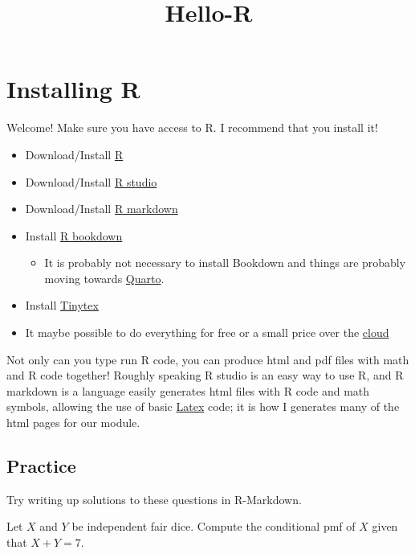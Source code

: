 \documentclass[
]{article}
\title{Hello-R}
\author{}
\date{\vspace{-2.5em}}
\providecommand{\tightlist}{%
  \setlength{\itemsep}{0pt}\setlength{\parskip}{0pt}}
\begin{document}
\maketitle

\section{Installing R}\label{installing-r}

Welcome! Make sure you have access to R. I recommend that you install
it!

\begin{itemize}
\item
  Download/Install \href{https://www.r-project.org/}{R}
\item
  Download/Install \href{https://rstudio.com/}{R studio}
\item
  Download/Install \href{https://rmarkdown.rstudio.com/}{R markdown}
\item
  Install \href{https://bookdown.org/yihui/bookdown/get-started.html}{R
  bookdown}

  \begin{itemize}
  \tightlist
  \item
    It is probably not necessary to install Bookdown and things are
    probably moving towards
    \href{https://tsoo-math.github.io/ucl3/quarto.html}{Quarto}.
  \end{itemize}
\item
  Install \href{https://yihui.org/tinytex/}{Tinytex}
\item
  It maybe possible to do everything for free or a small price over the
  \href{https://posit.cloud/}{cloud}
\end{itemize}

Not only can you type run R code, you can produce html and pdf files
with math and R code together! Roughly speaking R studio is an easy way
to use R, and R markdown is a language easily generates html files with
R code and math symbols, allowing the use of basic
\href{https://en.wikibooks.org/wiki/LaTeX/Mathematics}{Latex} code; it
is how I generates many of the html pages for our module.

\subsection{Practice}\label{practice}

Try writing up solutions to these questions in R-Markdown.

\begin{exercise}
    Let $X$ and $Y$ be independent fair dice.  Compute the conditional pmf of $X$ given that $X+Y = 7$.
\end{exercise}
\end{document}
